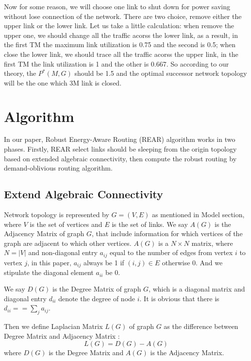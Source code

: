 \documentclass[conference]{IEEEtran}
\begin{document}
Now for some reason, we will choose one link to shut down for power saving without lose connection of the network. 
There are two choice, remove either the upper link or the lower link. Let us take a little calculation: when 
remove the upper one, we should change all the traffic acorss the lower link, as a result, in the first  
TM the maximum link utilization is 0.75 and the second is 0.5; when close the lower link, we should trace all the 
traffic acorss the upper link, in the first TM the link utilization is 1 and the other is 0.667. 
So according to our theory, the $P^{*}(M, G)$ should be 1.5 and the optimal successor network topology will be
the one which 3M link is closed.

\section{Algorithm}
In our paper, Robust Energy-Aware Routing (REAR) algorithm works in two phases. Firstly, REAR select links 
should be sleeping from the origin topology based on extended algebraic connectivity, then compute the robust 
routing by demand-oblivious routing algorithm.


\subsection{Extend Algebraic Connectivity}
Network topology is represented by $G = (V, E)$ as mentioned in Model section, where $V$ is the set of vertices
and $E$ is the set of links. We say $A(G)$ is the Adjacency Matrix of graph $G$, that include information for which
vertices of the graph are adjacent to which other vertices. $A(G)$ is a $N \times N$ matrix, where
$N = |V|$ and non-diagonal entry $a_{ij}$ equal to the number of edges from vertex $i$ to vertex $j$, in this paper,
$a_{ij}$ always be 1 if $(i,j) \in E$ otherwise 0. And we stipulate the diagonal element $a_{ii}$ be 0.


We say $D(G)$ is the Degree Matrix of graph $G$, which is a diagonal matrix and diagonal entry $d_{ii}$ denote 
the degree of node $i$. It is obvious that there is $d_{ii} == \sum_{j} a_{ij}$.


Then we define Laplacian Matrix $L(G)$ of graph $G$ as the difference between Degree Matrix and Adjacency Matrix :
\begin{equation}
	L(G) = D(G) - A(G)
\end{equation}
where $D(G)$ is the Degree Matrix and $A(G)$ is the Adjacency Matrix.
\end{document}
